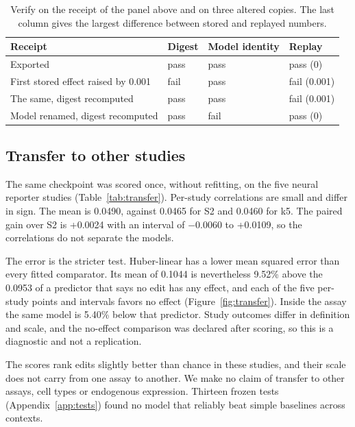 \documentclass[10.5pt,a4paper]{article}
\begin{document}
\begin{table}[htb]
\small
\caption{Verify on the receipt of the panel above and on three altered copies. The last column gives the largest difference between stored and replayed numbers.}\label{tab:verify}
\begin{tabular}{@{}L{62mm}L{18mm}L{26mm}L{26mm}@{}}
\toprule
Receipt & Digest & Model identity & Replay \\
\midrule
Exported & pass & pass & pass (0) \\
First stored effect raised by 0.001 & fail & pass & fail (0.001) \\
The same, digest recomputed & pass & pass & fail (0.001) \\
Model renamed, digest recomputed & pass & fail & pass (0) \\
\bottomrule
\end{tabular}
\end{table}

\subsection{Transfer to other studies}\label{sec:transfer}

The same checkpoint was scored once, without refitting, on the five neural reporter studies (Table~\ref{tab:transfer}). Per-study correlations are small and differ in sign. The mean is 0.0490, against 0.0465 for S2 and 0.0460 for k5. The paired gain over S2 is +0.0024 with an interval of −0.0060 to +0.0109, so the correlations do not separate the models.

The error is the stricter test. Huber-linear has a lower mean squared error than every fitted comparator. Its mean of 0.1044 is nevertheless 9.52\% above the 0.0953 of a predictor that says no edit has any effect, and each of the five per-study points and intervals favors no effect (Figure~\ref{fig:transfer}). Inside the assay the same model is 5.40\% below that predictor. Study outcomes differ in definition and scale, and the no-effect comparison was declared after scoring, so this is a diagnostic and not a replication.

The scores rank edits slightly better than chance in these studies, and their scale does not carry from one assay to another. We make no claim of transfer to other assays, cell types or endogenous expression. Thirteen frozen tests (Appendix~\ref{app:tests}) found no model that reliably beat simple baselines across contexts.
\end{document}
